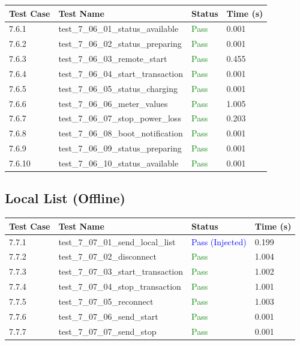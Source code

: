 \documentclass{article}
\begin{document}
\begin{longtable}{p{} p{} p{} p{}}
\toprule
\textbf{Test Case} & \textbf{Test Name} & \textbf{Status} & \textbf{Time (s)} \\
\midrule
\endhead
7.6.1 & test\_7\_06\_01\_status\_available & \textcolor{green}{Pass} & 0.001 \\
7.6.2 & test\_7\_06\_02\_status\_preparing & \textcolor{green}{Pass} & 0.001 \\
7.6.3 & test\_7\_06\_03\_remote\_start & \textcolor{green}{Pass} & 0.455 \\
7.6.4 & test\_7\_06\_04\_start\_transaction & \textcolor{green}{Pass} & 0.001 \\
7.6.5 & test\_7\_06\_05\_status\_charging & \textcolor{green}{Pass} & 0.001 \\
7.6.6 & test\_7\_06\_06\_meter\_values & \textcolor{green}{Pass} & 1.005 \\
7.6.7 & test\_7\_06\_07\_stop\_power\_loss & \textcolor{green}{Pass} & 0.203 \\
7.6.8 & test\_7\_06\_08\_boot\_notification & \textcolor{green}{Pass} & 0.001 \\
7.6.9 & test\_7\_06\_09\_status\_preparing & \textcolor{green}{Pass} & 0.001 \\
7.6.10 & test\_7\_06\_10\_status\_available & \textcolor{green}{Pass} & 0.001 \\
\bottomrule
\end{longtable}
\subsection{Local List (Offline)}

\begin{longtable}{p{} p{} p{} p{}}
\toprule
\textbf{Test Case} & \textbf{Test Name} & \textbf{Status} & \textbf{Time (s)} \\
\midrule
\endhead
7.7.1 & test\_7\_07\_01\_send\_local\_list & \textcolor{blue}{Pass (Injected)} & 0.199 \\
7.7.2 & test\_7\_07\_02\_disconnect & \textcolor{green}{Pass} & 1.004 \\
7.7.3 & test\_7\_07\_03\_start\_transaction & \textcolor{green}{Pass} & 1.002 \\
7.7.4 & test\_7\_07\_04\_stop\_transaction & \textcolor{green}{Pass} & 1.001 \\
7.7.5 & test\_7\_07\_05\_reconnect & \textcolor{green}{Pass} & 1.003 \\
7.7.6 & test\_7\_07\_06\_send\_start & \textcolor{green}{Pass} & 0.001 \\
7.7.7 & test\_7\_07\_07\_send\_stop & \textcolor{green}{Pass} & 0.001 \\
\bottomrule
\end{longtable}
\end{document}
